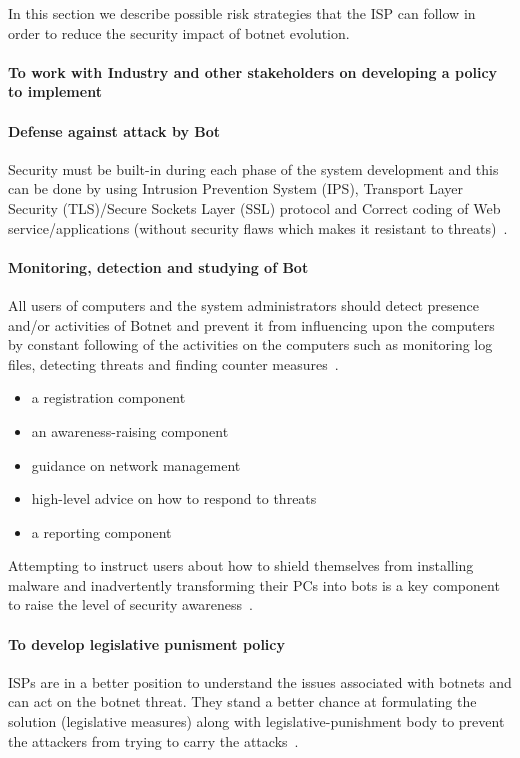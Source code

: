 
In this section we describe possible risk strategies that the ISP can follow in order to reduce the security impact of botnet evolution.
\paragraph{To work with Industry and other stakeholders on developing a policy to implement}


\paragraph{Defense against attack by Bot}
Security must be built-in during each phase of the system development and this can be done by using Intrusion Prevention System (IPS), Transport Layer Security (TLS)/Secure Sockets Layer (SSL) protocol and Correct coding of Web service/applications (without security flaws which makes it resistant to threats)~\cite{stankovic2009defense}.


\paragraph{Monitoring, detection and studying of Bot}
All users of computers and the system administrators should detect presence and/or activities of Botnet and prevent it from influencing upon the computers by constant following of the activities on the computers such as monitoring log files, detecting threats and finding counter measures~\cite{stankovic2009defense}.

\begin{itemize}
    \item a registration component
    \item an awareness-raising component
    \item guidance on network management
    \item high-level advice on how to respond to threats
    \item a reporting component
\end{itemize}

Attempting to instruct users about how to shield themselves from installing malware and inadvertently transforming their PCs into bots is a key component to raise the level of security awareness~\cite{stankovic2009defense}.


\paragraph{To develop legislative punisment policy}
ISPs are in a better position to understand the issues associated with botnets and can act on the botnet threat. They stand a better chance at formulating the solution (legislative measures) along with legislative-punishment body to prevent the attackers from trying to carry the attacks~\cite{stankovic2009defense}.



